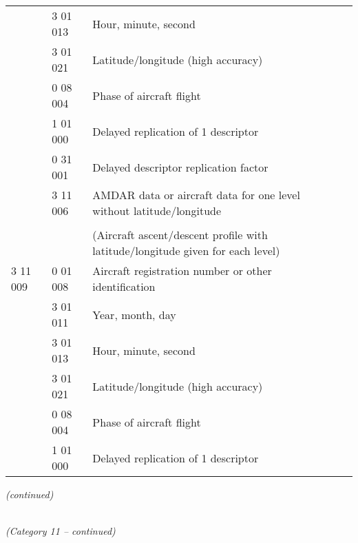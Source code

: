 \begin{longtable}[]{@{}llll@{}}
& 3 01 013 & Hour, minute, second &\tabularnewline
& 3 01 021 & Latitude/longitude (high accuracy) &\tabularnewline
& 0 08 004 & Phase of aircraft flight &\tabularnewline
& 1 01 000 & Delayed replication of 1 descriptor &\tabularnewline
& 0 31 001 & Delayed descriptor replication factor &\tabularnewline
& 3 11 006 & AMDAR data or aircraft data for one level without latitude/longitude &\tabularnewline
& & &\tabularnewline
& & (Aircraft ascent/descent profile with latitude/longitude given for each level) &\tabularnewline
3 11 009 & 0 01 008 & Aircraft registration number or other identification &\tabularnewline
& 3 01 011 & Year, month, day &\tabularnewline
& 3 01 013 & Hour, minute, second &\tabularnewline
& 3 01 021 & Latitude/longitude (high accuracy) &\tabularnewline
& 0 08 004 & Phase of aircraft flight &\tabularnewline
& 1 01 000 & Delayed replication of 1 descriptor &\tabularnewline
\bottomrule
\end{longtable}

\emph{(continued)}

\emph{\\
(Category 11 -- continued)}

